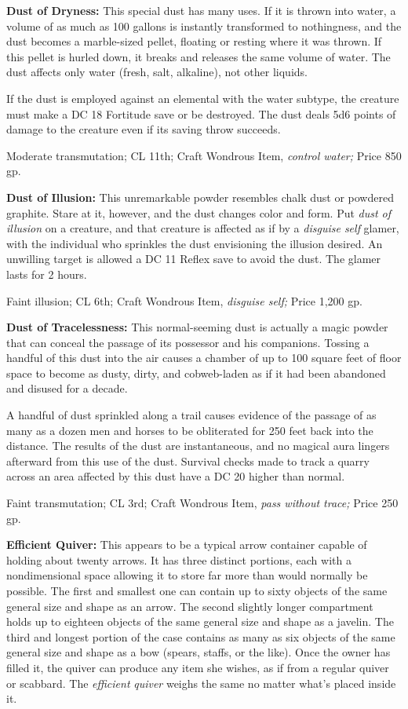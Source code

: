\textbf{Dust of Dryness:} This special dust has many uses. If it is thrown into 
water, a volume of as much as 100 gallons is instantly transformed to nothingness, 
and the dust becomes a marble-sized pellet, floating or resting where it was thrown. 
If this pellet is hurled down, it breaks and releases the same volume of water. 
The dust affects only water (fresh, salt, alkaline), not other liquids.

If the dust is employed against an elemental with the water subtype, the creature 
must make a DC 18 Fortitude save or be destroyed. The dust deals 5d6 points of 
damage to the creature even if its saving throw succeeds.

Moderate transmutation; CL 11th; Craft Wondrous Item, \textit{control water; }Price 
850 gp.

\textbf{Dust of Illusion:} This unremarkable powder resembles chalk dust or powdered 
graphite. Stare at it, however, and the dust changes color and form. Put \textit{dust 
of illusion }on a creature, and that creature is affected as if by a \textit{disguise 
self }glamer, with the individual who sprinkles the dust envisioning the illusion 
desired. An unwilling target is allowed a DC 11 Reflex save to avoid the dust. 
The glamer lasts for 2 hours.

Faint illusion; CL 6th; Craft Wondrous Item, \textit{disguise self; }Price 1,200 
gp.

\textbf{Dust of Tracelessness:} This normal-seeming dust is actually a magic powder 
that can conceal the passage of its possessor and his companions. Tossing a handful 
of this dust into the air causes a chamber of up to 100 square feet of floor space 
to become as dusty, dirty, and cobweb-laden as if it had been abandoned and disused 
for a decade.

A handful of dust sprinkled along a trail causes evidence of the passage of as 
many as a dozen men and horses to be obliterated for 250 feet back into the distance. 
The results of the dust are instantaneous, and no magical aura lingers afterward 
from this use of the dust. Survival checks made to track a quarry across an area 
affected by this dust have a DC 20 higher than normal.

Faint transmutation; CL 3rd; Craft Wondrous Item, \textit{pass without trace; }Price 
250 gp.

\textbf{Efficient Quiver:} This appears to be a typical arrow container capable 
of holding about twenty arrows. It has three distinct portions, each with a nondimensional 
space allowing it to store far more than would normally be possible. The first 
and smallest one can contain up to sixty objects of the same general size and shape 
as an arrow. The second slightly longer compartment holds up to eighteen objects 
of the same general size and shape as a javelin. The third and longest portion 
of the case contains as many as six objects of the same general size and shape 
as a bow (spears, staffs, or the like). Once the owner has filled it, the quiver 
can produce any item she wishes, as if from a regular quiver or scabbard. The \textit{efficient} 
\textit{quiver }weighs the same no matter what's placed inside it.

